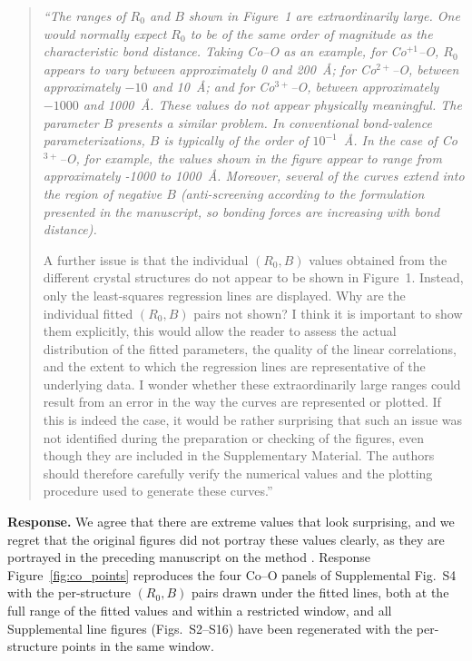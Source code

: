 \documentclass[11pt]{article}
\newenvironment{refquote}%
  {\begin{quote}\itshape\color{black!70}}%
  {\end{quote}}
\begin{document}
\begin{refquote}
``The ranges of $R_0$ and $B$ shown in Figure~1 are extraordinarily
large.  One would normally expect $R_0$ to be of the same order of
magnitude as the characteristic bond distance.  Taking Co--O as an
example, for Co$^{+1}$--O, $R_0$ appears to vary between
approximately 0 and 200~\AA; for Co$^{2+}$--O, between approximately
$-10$ and 10~\AA; and for Co$^{3+}$--O, between approximately $-1000$
and 1000~\AA.  These values do not appear physically meaningful.  The
parameter $B$ presents a similar problem.  In conventional
bond-valence parameterizations, $B$ is typically of the order of
$10^{-1}$~\AA.  In the case of Co$^{3+}$--O, for example, the values
shown in the figure appear to range from approximately -1000 to
1000~\AA.  Moreover, several of the curves extend into the region of
negative $B$ (anti-screening according to the formulation presented
in the manuscript, so bonding forces are increasing with bond
distance).

A further issue is that the individual $(R_0,B)$ values obtained from
the different crystal structures do not appear to be shown in
Figure~1.  Instead, only the least-squares regression lines are
displayed.  Why are the individual fitted $(R_0,B)$ pairs not shown?
I think it is important to show them explicitly, this would allow the
reader to assess the actual distribution of the fitted parameters,
the quality of the linear correlations, and the extent to which the
regression lines are representative of the underlying data.  I wonder
whether these extraordinarily large ranges could result from an error
in the way the curves are represented or plotted.  If this is indeed
the case, it would be rather surprising that such an issue was not
identified during the preparation or checking of the figures, even
though they are included in the Supplementary Material.  The authors
should therefore carefully verify the numerical values and the
plotting procedure used to generate these curves.''
\end{refquote}


\textbf{Response.}  We agree that there are extreme values that look
surprising, and we regret that the original figures did not portray
these values clearly, as they are portrayed in the
preceding manuscript on the method \cite{Li2025}.
Response Figure~\ref{fig:co_points} reproduces the four Co--O panels of
Supplemental Fig.~S4 with the per-structure $(R_0,B)$ pairs drawn
under the fitted lines, both at the full range of the fitted values
and within a restricted window, and all Supplemental line figures
(Figs.~S2--S16) have been regenerated with the per-structure points
in the same window.
\end{document}
